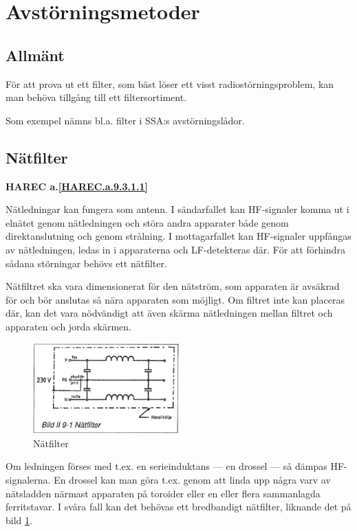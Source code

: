 \section{Avstörningsmetoder}

\subsection{Allmänt}
För att prova ut ett filter, som bäst löser ett visst radiostörningsproblem,
kan man behöva tillgång till ett filtersortiment.

Som exempel nämns bl.a. filter i SSA:s avstörningslådor.

\subsection{Nätfilter}
\textbf{
HAREC a.\ref{HAREC.a.9.3.1.1}\label{myHAREC.a.9.3.1.1}
}

Nätledningar kan fungera som antenn. I sändarfallet kan HF-signaler komma ut i
elnätet genom nätledningen och störa andra apparater både genom direktanslutning
och genom strålning. I mottagarfallet kan HF-signaler uppfångas av nätledningen,
ledas in i apparaterna och LF-detekteras där. För att förhindra sådana
störningar behövs ett nätfilter.

Nätfiltret ska vara dimensionerat för den nätström, som apparaten är avsäkrad
för och bör anslutas så nära apparaten som möjligt. Om filtret inte kan placeras
där, kan det vara nödvändigt att även skärma nätledningen mellan filtret och
apparaten och jorda skärmen.

\begin{figure}
  \includegraphics[width=0.5\textwidth]{images/bild_2_9-01}
  \caption{Nätfilter}
  \label{fig:bildII9-1}
\end{figure}

Om ledningen förses med t.ex. en serieinduktans --- en drossel --- så dämpas
HF-signalerna. En drossel kan man göra t.ex. genom att linda upp några varv av
nätsladden närmast apparaten på toroider eller en eller flera sammanlagda
ferritstavar. I svåra fall kan det behövas ett bredbandigt nätfilter, liknande
det på bild \ref{fig:bildII9-1}.

